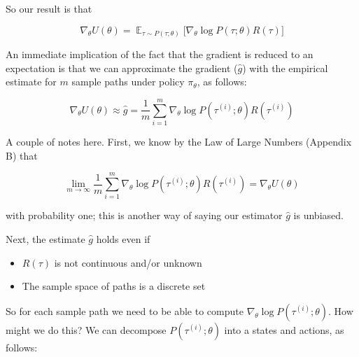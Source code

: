 \documentclass[11pt, oneside]{article}					%
\DeclareMathOperator{\E}{\mathbb{E}}
\begin{document}
\bigskip
\noindent
So our result is that 

\begin{equation*}
\nabla_{\theta} U(\theta) = \E_{\tau \sim P(\tau;\theta)} 
\Big [\nabla_{\theta} \log P(\tau; \theta) R(\tau) \Big ]
\end{equation*}

\bigskip
\noindent
An immediate implication of the fact that the gradient is reduced
to an expectation is that we can approximate the gradient
($\hat{g}$) with the empirical estimate for $m$ sample paths
under policy $\pi_\theta$,  as follows: 

\begin{equation}
\nabla_\theta U(\theta) \approx \hat{g} = \frac{1}{m}
\sum\limits_{i = 1}^{m} \nabla_{\theta} \log  P(\tau^{(i)} ;
\theta) R(\tau^{(i)}) 
\label{eqn:g-hat}
\end{equation}

\bigskip
\noindent
A couple of notes here. First, we know by the Law of Large
Numbers (Appendix B) that 

\bigskip
\begin{equation*}
\lim\limits_{m \to \infty} \frac{1}{m} \sum\limits_{i = 1}^{m}
\nabla_{\theta} \log P(\tau^{(i)} ; \theta) R(\tau^{(i)})
= \nabla_\theta U(\theta)
\end{equation*}

\bigskip
\noindent
with probability one; this
is another way of saying our estimator $\hat{g}$ is
unbiased. 

\bigskip
\noindent
Next, the estimate $\hat{g}$ holds even if

\begin{itemize}
\item $R(\tau)$ is not continuous and/or unknown
\item The sample space of paths is a discrete set
\end{itemize}

\medskip
\noindent
So for each sample path we need to be able to compute
$\nabla_{\theta} \log P(\tau^{(i)};\theta)$. How might we do
this? We can decompose $P(\tau^{(i)}; \theta)$ into a states and
actions, as follows:
\end{document}

